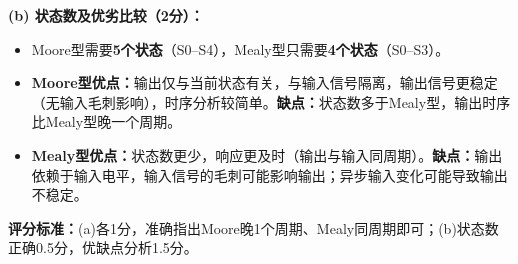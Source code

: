 \textbf{(b) 状态数及优劣比较（2分）：}
\begin{itemize}
  \item Moore型需要\textbf{5个状态}（S0--S4），Mealy型只需要\textbf{4个状态}（S0--S3）。
  \item \textbf{Moore型优点：}输出仅与当前状态有关，与输入信号隔离，输出信号更稳定（无输入毛刺影响），时序分析较简单。\textbf{缺点：}状态数多于Mealy型，输出时序比Mealy型晚一个周期。
  \item \textbf{Mealy型优点：}状态数更少，响应更及时（输出与输入同周期）。\textbf{缺点：}输出依赖于输入电平，输入信号的毛刺可能影响输出；异步输入变化可能导致输出不稳定。
\end{itemize}

\textbf{评分标准：}(a)各1分，准确指出Moore晚1个周期、Mealy同周期即可；(b)状态数正确0.5分，优缺点分析1.5分。

\endinput
